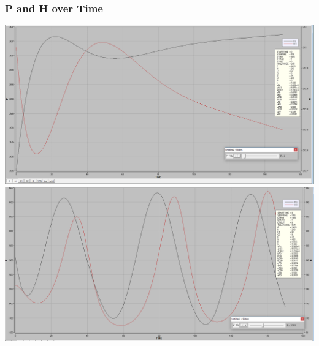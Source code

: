 \documentclass [12pt] {article}
\begin{document}
\subsubsection{P and H over Time}
\includegraphics[scale=0.3]{graph1a.png} \\
\includegraphics[scale=0.3]{graph1b.png}
\end{document}
